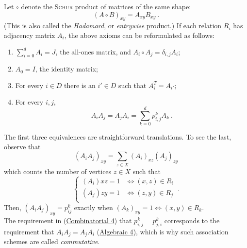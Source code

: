 \documentclass{report}
\begin{document}
    \begin{defn}
      \label{association-scheme-alg}
      Let $\circ$ denote the \textsc{Schur} product of matrices of the same shape:
      \begin{equation}\label{schur-prod}
        (A \circ B)_{xy} = A_{xy} B_{xy}
        \ .
      \end{equation}
      (This is also called the \textit{Hadamard}, or \textit{entrywise} product.)
      If each relation $R_i$ has adjacency matrix $A_i$,
      the above axioms can be reformulated as follows:
      \begin{enumerate}
        \item $\displaystyle \sum_{i=0}^d A_i = J$, the all-ones matrix,
          and $A_i \circ A_j = \delta_{i, j} A_i$;
          \label{aAS-part}
        \item $A_0 = I$, the identity matrix;
          \label{aAS-diag}
        \item For every $i \in D$ there is an $i' \in D$ such that $A_i^T =
          A_{i'}$;
          \label{aAS-sym}
        \item For every $i, j$,
          $$
            A_i A_j = A_j A_i = \sum_{k = 0}^d p_{i, j}^k A_k
            \ .
          $$
          \label{aAS-reg}
      \end{enumerate}
    \end{defn}

    The first three equivalences are straightforward translations.  To see the
    last, observe that
    $$
      (A_i A_j)_{xy} = \sum_{z \in X} (A_i)_{xz} (A_j)_{zy}
    $$
    which counts the number of vertices $z \in X$ such that
    $$
      \begin{cases}
        (A_i){xz} = 1 & \iff (x, z) \in R_i \\
        (A_j){zy} = 1 & \iff (z, y) \in R_j \\
      \end{cases}\ .
    $$
    Then, $(A_i A_j)_{xy} = p_{ij}^k$ exactly when $(A_k)_{xy} = 1 \iff (x, y)
    \in R_k$.
    \\

    The requirement in (\hyperref[cAS-reg]{Combinatorial 4}) that $p_{i, j}^k =
    p_{j, i}^k$ corresponds to the requirement that $A_i A_j = A_j A_i$
    (\hyperref[aAS-reg]{Algebraic 4}), which is why such association schemes are
    called \textit{commutative}.
\end{document}
